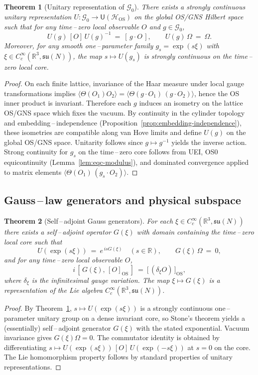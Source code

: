 \documentclass[11pt]{amsart}
\theoremstyle{plain}
\newtheorem{theorem}{Theorem}[section]
\theoremstyle{definition}
\theoremstyle{remark}
\begin{document}
\begin{theorem}[Unitary representation of $\mathcal G_0$]\label{thm:unitary-gauge}
There exists a strongly continuous unitary representation $U: \mathcal G_0\to \mathsf U(\mathcal H_{\mathrm{OS}})$ on the global OS/GNS Hilbert space such that for any time\,–\,zero local observable $O$ and $g\in\mathcal G_0$,
\[
  U(g)\,[O]\,U(g)^{-1}\ =\ [\,g\cdot O\,],\qquad U(g)\,\Omega\ =\ \Omega.
\]
Moreover, for any smooth one\,–\,parameter family $g_s=\exp(s\xi)$ with $\xi\in C_c^\infty(\mathbb R^3,\mathfrak{su}(N))$, the map $s\mapsto U(g_s)$ is strongly continuous on the time\,–\,zero local core.
\end{theorem}
\begin{proof}
On each finite lattice, invariance of the Haar measure under local gauge transformations implies $\langle \Theta(O_1) O_2\rangle=\langle \Theta(g\cdot O_1)\, (g\cdot O_2)\rangle$, hence the OS inner product is invariant. Therefore each $g$ induces an isometry on the lattice OS/GNS space which fixes the vacuum. By continuity in the cylinder topology and embedding\,–\,independence (Proposition~\ref{prop:embedding-independence}), these isometries are compatible along van Hove limits and define $U(g)$ on the global OS/GNS space. Unitarity follows since $g\mapsto g^{-1}$ yields the inverse action. Strong continuity for $g_s$ on the time\,–\,zero core follows from UEI, OS0 equicontinuity (Lemma~\ref{lem:eqc-modulus}), and dominated convergence applied to matrix elements $\langle \Theta(O_1)\, (g_s\cdot O_2)\rangle$.
\end{proof}

\subsection{Gauss\,–\,law generators and physical subspace}

\begin{theorem}[Self\,–\,adjoint Gauss generators]\label{thm:gauss-generators}
For each $\xi\in C_c^\infty(\mathbb R^3,\mathfrak{su}(N))$ there exists a self\,–\,adjoint operator $G(\xi)$ with domain containing the time\,–\,zero local core such that
\[
  U(\exp(s\xi))\ =\ e^{\,i s G(\xi)}\quad (s\in\mathbb R),\qquad G(\xi)\,\Omega\ =\ 0,
\]
and for any time\,–\,zero local observable $O$,
\[
  i\,[\,G(\xi),\,[O]_{\mathrm{OS}}\,]\ =\ \big[\,(\delta_\xi O)\,\big]_{\mathrm{OS}},
\]
where $\delta_\xi$ is the infinitesimal gauge variation. The map $\xi\mapsto G(\xi)$ is a representation of the Lie algebra $C_c^\infty(\mathbb R^3,\mathfrak{su}(N))$.
\end{theorem}
\begin{proof}
By Theorem~\ref{thm:unitary-gauge}, $s\mapsto U(\exp(s\xi))$ is a strongly continuous one\,–\,parameter unitary group on a dense invariant core, so Stone's theorem yields a (essentially) self\,–\,adjoint generator $G(\xi)$ with the stated exponential. Vacuum invariance gives $G(\xi)\Omega=0$. The commutator identity is obtained by differentiating $s\mapsto U(\exp(s\xi))\,[O]\,U(\exp(-s\xi))$ at $s=0$ on the core. The Lie homomorphism property follows by standard properties of unitary representations.
\end{proof}
\end{document}
